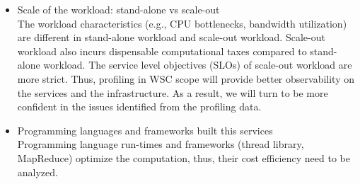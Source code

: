 \begin{itemize}
  \item Scale of the workload: stand-alone vs scale-out \autocite{DBLP:conf/asplos/FerdmanAKVAJKPAF12} \\
    The workload characteristics (e.g., CPU bottlenecks, bandwidth utilization) are different in stand-alone workload and scale-out workload. Scale-out workload also incurs dispensable computational taxes compared to stand-alone workload. The service level objectives (SLOs) of scale-out workload are more strict. Thus, profiling in WSC scope will provide better observability on the services and the infrastructure. As a result, we will turn to be more confident in the issues identified from the profiling data.
  \item Programming languages and frameworks built this services \autocite{DBLP:conf/asplos/FerdmanAKVAJKPAF12, DBLP:conf/iwqos/GuoCWDFMB19} \\
    Programming language run-times and frameworks (thread library, MapReduce) optimize the computation, thus, their cost efficiency need to be analyzed.


\end{itemize}
